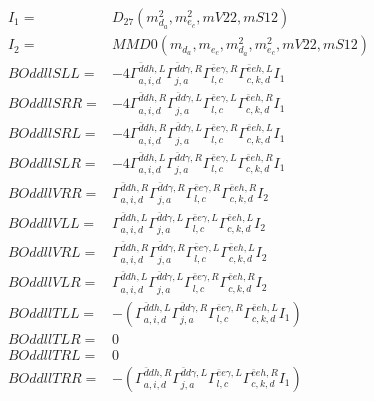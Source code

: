\documentclass[A4,landscape]{article}
\begin{document}
\begin{align} 
I_1 = & D_{27}(m^2_{d_{{a}}}, m^2_{e_{{c}}}, mV22, mS12) \\ 
I_2 = & MMD0(m_{d_{{a}}}, m_{e_{{c}}}, m^2_{d_{{a}}}, m^2_{e_{{c}}}, mV22, mS12) \\ 
  BOddllSLL= & -4  \Gamma^{\bar{d}d h ,L}_{a, i, d} \Gamma^{\bar{d}d \gamma ,R}_{j, a} \Gamma^{\bar{e}e \gamma ,R}_{l, c} \Gamma^{\bar{e}e h ,L}_{c, k, d} I_1 \\ 
  BOddllSRR= & -4  \Gamma^{\bar{d}d h ,R}_{a, i, d} \Gamma^{\bar{d}d \gamma ,L}_{j, a} \Gamma^{\bar{e}e \gamma ,L}_{l, c} \Gamma^{\bar{e}e h ,R}_{c, k, d} I_1 \\ 
  BOddllSRL= & -4  \Gamma^{\bar{d}d h ,R}_{a, i, d} \Gamma^{\bar{d}d \gamma ,L}_{j, a} \Gamma^{\bar{e}e \gamma ,R}_{l, c} \Gamma^{\bar{e}e h ,L}_{c, k, d} I_1 \\ 
  BOddllSLR= & -4  \Gamma^{\bar{d}d h ,L}_{a, i, d} \Gamma^{\bar{d}d \gamma ,R}_{j, a} \Gamma^{\bar{e}e \gamma ,L}_{l, c} \Gamma^{\bar{e}e h ,R}_{c, k, d} I_1 \\ 
  BOddllVRR= &  \Gamma^{\bar{d}d h ,R}_{a, i, d} \Gamma^{\bar{d}d \gamma ,R}_{j, a} \Gamma^{\bar{e}e \gamma ,R}_{l, c} \Gamma^{\bar{e}e h ,R}_{c, k, d} I_2 \\ 
  BOddllVLL= &  \Gamma^{\bar{d}d h ,L}_{a, i, d} \Gamma^{\bar{d}d \gamma ,L}_{j, a} \Gamma^{\bar{e}e \gamma ,L}_{l, c} \Gamma^{\bar{e}e h ,L}_{c, k, d} I_2 \\ 
  BOddllVRL= &  \Gamma^{\bar{d}d h ,R}_{a, i, d} \Gamma^{\bar{d}d \gamma ,R}_{j, a} \Gamma^{\bar{e}e \gamma ,L}_{l, c} \Gamma^{\bar{e}e h ,L}_{c, k, d} I_2 \\ 
  BOddllVLR= &  \Gamma^{\bar{d}d h ,L}_{a, i, d} \Gamma^{\bar{d}d \gamma ,L}_{j, a} \Gamma^{\bar{e}e \gamma ,R}_{l, c} \Gamma^{\bar{e}e h ,R}_{c, k, d} I_2 \\ 
  BOddllTLL= & -( \Gamma^{\bar{d}d h ,L}_{a, i, d} \Gamma^{\bar{d}d \gamma ,R}_{j, a} \Gamma^{\bar{e}e \gamma ,R}_{l, c} \Gamma^{\bar{e}e h ,L}_{c, k, d} I_1) \\ 
  BOddllTLR= & 0 \\ 
  BOddllTRL= & 0 \\ 
  BOddllTRR= & -( \Gamma^{\bar{d}d h ,R}_{a, i, d} \Gamma^{\bar{d}d \gamma ,L}_{j, a} \Gamma^{\bar{e}e \gamma ,L}_{l, c} \Gamma^{\bar{e}e h ,R}_{c, k, d} I_1) \\ 
\end{align} 
\end{document}
